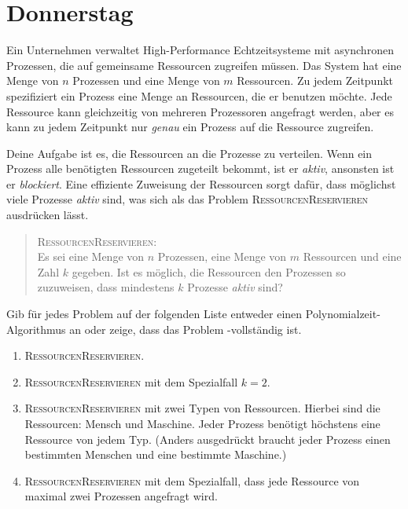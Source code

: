 \documentclass{uebung_cs}
\begin{document}
\section*{Donnerstag}

\begin{aufgabe}[Ressourcenmanagement]
	Ein Unternehmen verwaltet High-Performance Echtzeitsysteme mit asynchronen Prozessen, die auf gemeinsame Ressourcen zugreifen müssen. Das System hat eine Menge von $n$ Prozessen und eine Menge von $m$ Ressourcen. 
	Zu jedem Zeitpunkt spezifiziert ein Prozess eine Menge an Ressourcen, die er benutzen möchte. Jede Ressource kann gleichzeitig von mehreren Prozessoren angefragt werden, aber es kann zu jedem Zeitpunkt nur \emph{genau} ein Prozess auf die Ressource zugreifen. 
	
	Deine Aufgabe ist es, die Ressourcen an die Prozesse zu verteilen. Wenn ein Prozess alle benötigten Ressourcen zugeteilt bekommt, ist er \textit{aktiv}, ansonsten ist er \textit{blockiert}. Eine effiziente Zuweisung der Ressourcen sorgt dafür, dass möglichst viele Prozesse \textit{aktiv} sind, was sich als das Problem \textsc{RessourcenReservieren} ausdrücken lässt.
	 \begin{quote}
	 \textsc{RessourcenReservieren}:\\
	 Es sei eine Menge von $n$ Prozessen, eine Menge von $m$ Ressourcen und eine Zahl $k$ gegeben. Ist es möglich, die Ressourcen den Prozessen so zuzuweisen, dass mindestens $k$ Prozesse \textit{aktiv} sind?
	 \end{quote}
	 
	Gib für jedes Problem auf der folgenden Liste entweder einen Polynomialzeit-Algorithmus an oder zeige, dass das Problem \NP-vollständig ist.
	 \begin{enumerate}
	 	\item \textsc{RessourcenReservieren}.
	 	\item \textsc{RessourcenReservieren} mit dem Spezialfall $k=2$.
	 	\item \textsc{RessourcenReservieren} mit zwei Typen von Ressourcen. Hierbei sind die Ressourcen: Mensch und Maschine. Jeder Prozess benötigt höchstens eine Ressource von jedem Typ. (Anders ausgedrückt braucht jeder Prozess einen bestimmten Menschen und eine bestimmte Maschine.)
	 	\item \textsc{RessourcenReservieren} mit dem Spezialfall, dass jede Ressource von maximal zwei Prozessen angefragt wird.	 	
	 \end{enumerate}
\end{aufgabe}
\end{document}

